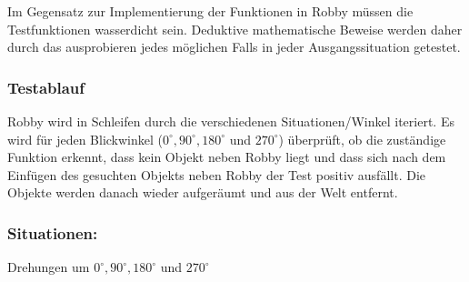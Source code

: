 Im Gegensatz zur Implementierung der Funktionen in Robby müssen die Testfunktionen wasserdicht sein. Deduktive mathematische Beweise werden daher durch das ausprobieren jedes möglichen Falls in jeder Ausgangssituation getestet.

\subsubsection*{Testablauf}
Robby wird in Schleifen durch die verschiedenen Situationen/Winkel iteriert. Es wird für jeden Blickwinkel ($0^\circ, 90^\circ, 180^\circ$ und $270^\circ$) überprüft, ob die zuständige Funktion erkennt, dass kein Objekt neben Robby liegt und dass sich nach dem Einfügen des gesuchten Objekts neben Robby der Test positiv ausfällt. Die Objekte werden danach wieder aufgeräumt und aus der Welt entfernt. 

\subsubsection*{Situationen: }
Drehungen um $0^\circ, 90^\circ, 180^\circ$ und $270^\circ$
